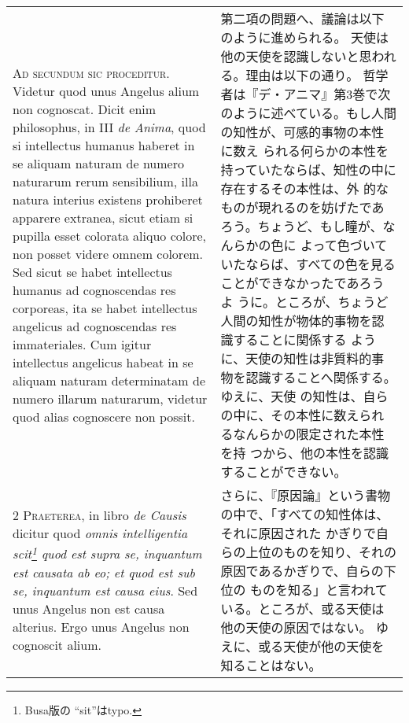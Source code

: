 \documentclass[10pt]{jsarticle} %
\begin{document}
\begin{longtable}{p{21em}p{21em}}





{\huge A}{\scshape d secundum sic proceditur}. Videtur quod
unus Angelus alium non cognoscat. Dicit enim philosophus, in III {\itshape de
Anima}, quod si intellectus humanus haberet in se aliquam naturam de
numero naturarum rerum sensibilium, illa natura interius existens
prohiberet apparere extranea, sicut etiam si pupilla esset colorata
aliquo colore, non posset videre omnem colorem. Sed sicut se habet
intellectus humanus ad cognoscendas res corporeas, ita se habet
intellectus angelicus ad cognoscendas res immateriales. Cum igitur
intellectus angelicus habeat in se aliquam naturam determinatam de
numero illarum naturarum, videtur quod alias cognoscere non possit.


&

第二項の問題へ、議論は以下のように進められる。
天使は他の天使を認識しないと思われる。理由は以下の通り。
哲学者は『デ・アニマ』第3巻で次のように述べている。もし人間の知性が、可感的事物の本性に数え
 られる何らかの本性を持っていたならば、知性の中に存在するその本性は、外
 的なものが現れるのを妨げたであろう。ちょうど、もし瞳が、なんらかの色に
 よって色づいていたならば、すべての色を見ることができなかったであろうよ
 うに。ところが、ちょうど人間の知性が物体的事物を認識することに関係する
 ように、天使の知性は非質料的事物を認識することへ関係する。ゆえに、天使
 の知性は、自らの中に、その本性に数えられるなんらかの限定された本性を持
 つから、他の本性を認識することができない。

\\


{\scshape 2 Praeterea}, in libro {\itshape de Causis} dicitur quod
{\itshape omnis intelligentia scit\footnote{Busa版の ``sit''はtypo.} quod est supra se, inquantum est causata ab eo;
et quod est sub se, inquantum est causa eius}. Sed unus Angelus non est
causa alterius. Ergo unus Angelus non cognoscit alium.


&

さらに、『原因論』という書物の中で、「すべての知性体は、それに原因された
 かぎりで自らの上位のものを知り、それの原因であるかぎりで、自らの下位の
 ものを知る」と言われている。ところが、或る天使は他の天使の原因ではない。
 ゆえに、或る天使が他の天使を知ることはない。

\\



\end{longtable}
\end{document}
